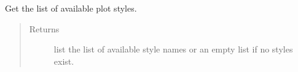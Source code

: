 \documentclass[letterpaper,10pt,english]{sphinxmanual}
\begin{document}

\begin{fulllineitems}
\label{\detokenize{pydv:pydvpy.get_styles}}
Get the list of available plot styles.
\begin{quote}\begin{description}
\item[{Returns}] \leavevmode
list \textendash{} the list of available style names or an empty list if no styles exist.

\end{description}\end{quote}

\end{fulllineitems}

\end{document}
